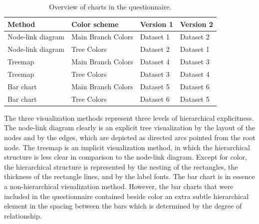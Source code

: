 \documentclass[journal]{vgtc}                %
\begin{document}
\begin{table}[!htb]
\begin{footnotesize}
\begin{center}
\begin{tabular}{llll}
\toprule
Method & Color scheme & Version 1 & Version 2\\
\midrule
Node-link diagram & Main Branch Colors & Dataset 1 & Dataset 2\\
Node-link diagram & Tree Colors & Dataset 2 & Dataset 1\\
Treemap & Main Branch Colors & Dataset 4 & Dataset 3\\
Treemap & Tree Colors & Dataset 3 & Dataset 4\\
Bar chart & Main Branch Colors & Dataset 5 & Dataset 6\\
Bar chart & Tree Colors & Dataset 6 & Dataset 5\\
\bottomrule
\end{tabular}
\vspace{-2ex}
\end{center}
\end{footnotesize}
\caption{Overview of charts in the questionnaire.}\label{table:ques}
\end{table}

 
The three visualization methods represent three levels of hierarchical explicitness. The node-link diagram clearly is an explicit tree visualization by the layout of the nodes and by the edges, which are depicted as directed arcs pointed from the root node. The treemap is an implicit visualization method, in which the hierarchical structure is less clear in comparison to the node-link diagram. Except for
color, the hierarchical structure is represented by the nesting of the rectangles, the thickness of the rectangle lines, and by the label fonts. The bar chart is in essence a non-hierarchical visualization method. However, the bar charts that were included in the questionnaire contained beside color an extra subtle hierarchical element in the spacing between the bars which is determined by the degree of relationship.%
\end{document}
